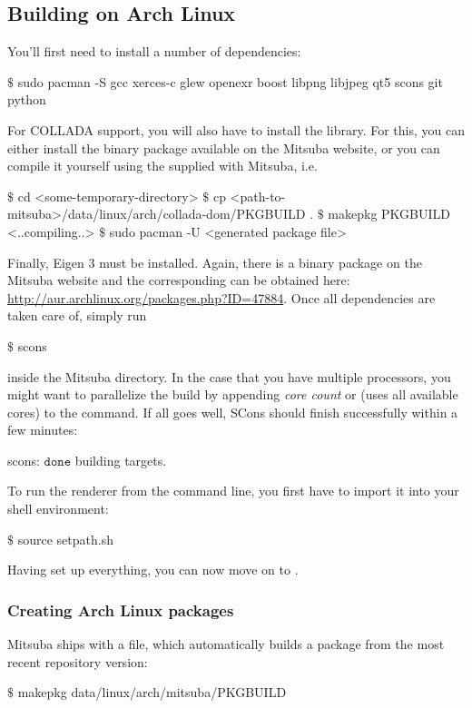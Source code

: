 \subsection{Building on Arch Linux}
You'll first need to install a number of dependencies:
\begin{shell}
$\text{\$}$ sudo pacman -S gcc xerces-c glew openexr boost libpng libjpeg qt5 scons git python
\end{shell}
For COLLADA support, you will also have to install the 
library. For this, you can either install the binary package available on
the Mitsuba website, or you can compile it yourself using the 
supplied with Mitsuba, i.e.
\begin{shell}
$\text{\$}$ cd <some-temporary-directory>
$\text{\$}$ cp <path-to-mitsuba>/data/linux/arch/collada-dom/PKGBUILD .
$\text{\$}$ makepkg PKGBUILD
<..compiling..>
$\text{\$}$ sudo pacman -U <generated package file>
\end{shell}
Finally, Eigen 3 must be installed. Again, there is a binary package on the
Mitsuba website and the corresponding  can be obtained here:
\url{http://aur.archlinux.org/packages.php?ID=47884}.
Once all dependencies are taken care of, simply run
\begin{shell}
$\text{\$}$ scons
\end{shell}
inside the Mitsuba directory. In the case that you have multiple processors, you might want to parallelize the build by appending \emph{core count} or  (uses all available cores) to the command.
If all goes well, SCons should finish successfully within a few minutes:
\begin{shell}
scons: $\texttt{done}$ building targets.
\end{shell}
To run the renderer from the command line, you first have to import it into your shell environment:
\begin{shell}
$\text{\$}$ source setpath.sh
\end{shell}

Having set up everything, you can now move on to .
\subsubsection{Creating Arch Linux packages}
Mitsuba ships with a  file, which automatically builds
a package from the most recent repository version:
\begin{shell}
$\text{\$}$ makepkg data/linux/arch/mitsuba/PKGBUILD
\end{shell}

